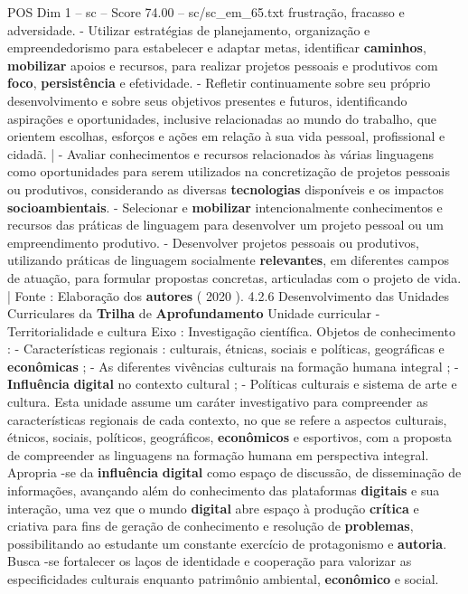 \begin{textsample}{POS Dim 1 – sc – Score 74.00 – sc/sc\_em\_65.txt}
frustração, fracasso e adversidade. - Utilizar estratégias de planejamento, organização e empreendedorismo para estabelecer e adaptar metas, identificar \textbf{caminhos}, \textbf{mobilizar} apoios e recursos, para realizar projetos pessoais e produtivos com \textbf{foco}, \textbf{persistência} e efetividade. - Refletir continuamente sobre seu próprio desenvolvimento e sobre seus objetivos presentes e futuros, identificando aspirações e oportunidades, inclusive relacionadas ao mundo do trabalho, que orientem escolhas, esforços e ações em relação à sua vida pessoal, profissional e cidadã. | - Avaliar conhecimentos e recursos relacionados às várias linguagens como oportunidades para serem utilizados na concretização de projetos pessoais ou produtivos, considerando as diversas \textbf{tecnologias} disponíveis e os impactos \textbf{socioambientais}. - Selecionar e \textbf{mobilizar} intencionalmente conhecimentos e recursos das práticas de linguagem para desenvolver um projeto pessoal ou um empreendimento produtivo. - Desenvolver projetos pessoais ou produtivos, utilizando práticas de linguagem socialmente \textbf{relevantes}, em diferentes campos de atuação, para formular propostas concretas, articuladas com o projeto de vida. | Fonte : Elaboração dos \textbf{autores} ( 2020 ). 4.2.6 Desenvolvimento das Unidades Curriculares da \textbf{Trilha} de \textbf{Aprofundamento} Unidade curricular - Territorialidade e cultura Eixo : Investigação científica.
Objetos de conhecimento : - Características regionais : culturais, étnicas, sociais e políticas, geográficas e \textbf{econômicas} ; - As diferentes vivências culturais na formação humana integral ; - \textbf{Influência} \textbf{digital} no contexto cultural ; - Políticas culturais e sistema de arte e cultura.
Esta unidade assume um caráter investigativo para compreender as características regionais de cada contexto, no que se refere a aspectos culturais, étnicos, sociais, políticos, geográficos, \textbf{econômicos} e esportivos, com a proposta de compreender as linguagens na formação humana em perspectiva integral.
Apropria -se da \textbf{influência} \textbf{digital} como espaço de discussão, de disseminação de informações, avançando além do conhecimento das plataformas \textbf{digitais} e sua interação, uma vez que o mundo \textbf{digital} abre espaço à produção \textbf{crítica} e criativa para fins de geração de conhecimento e resolução de \textbf{problemas}, possibilitando ao estudante um constante exercício de protagonismo e \textbf{autoria}.
Busca -se fortalecer os laços de identidade e cooperação para valorizar as especificidades culturais enquanto patrimônio ambiental, \textbf{econômico} e social.

\end{textsample}
